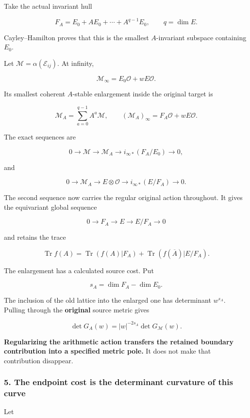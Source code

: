 Take the actual invariant hull

\[
\boxed{
F_A=E_0+AE_0+\cdots+A^{q-1}E_0,
\qquad q=\dim E.
}
\]

Cayley--Hamilton proves that this is the smallest \(A\)-invariant subspace containing \(E_0\).

Let \(\mathcal M=\alpha(\mathscr E_{ij})\). At infinity,

\[
\mathcal M_\infty=E_0\mathcal O+wE\mathcal O.
\]

Its smallest coherent \(A\)-stable enlargement inside the original target is

\[
\boxed{
\mathcal M_A=\sum_{a=0}^{q-1}A^a\mathcal M,
\qquad
(\mathcal M_A)_\infty=F_A\mathcal O+wE\mathcal O.
}
\]

The exact sequences are

\[
0\to\mathcal M\to\mathcal M_A
\to i_{\infty*}(F_A/E_0)\to0,
\]

and

\[
\boxed{
0\to\mathcal M_A\to E\otimes\mathcal O
\to i_{\infty*}(E/F_A)\to0.
}
\]

The second sequence now carries the regular original action throughout. It gives the equivariant global sequence

\[
0\to F_A\to E\to E/F_A\to0
\]

and retains the trace

\[
\operatorname{Tr}f(A)
=
\operatorname{Tr}(f(A)|F_A)
+
\operatorname{Tr}(f(\overline A)|E/F_A).
\]

The enlargement has a calculated source cost. Put

\[
s_A=\dim F_A-\dim E_0.
\]

The inclusion of the old lattice into the enlarged one has determinant \(w^{s_A}\). Pulling through the \textbf{original} source metric gives

\[
\boxed{
\det G_A(w)=|w|^{-2s_A}\det G_{\mathcal M}(w).
}
\]

\textbf{Regularizing the arithmetic action transfers the retained boundary contribution into a specified metric pole.} It does not make that contribution disappear.

\subsubsection{5. The endpoint cost is the determinant curvature of this curve}\label{endpoint-curvature_original--the-endpoint-cost-is-the-determinant-curvature-of-this-curve}

Let

